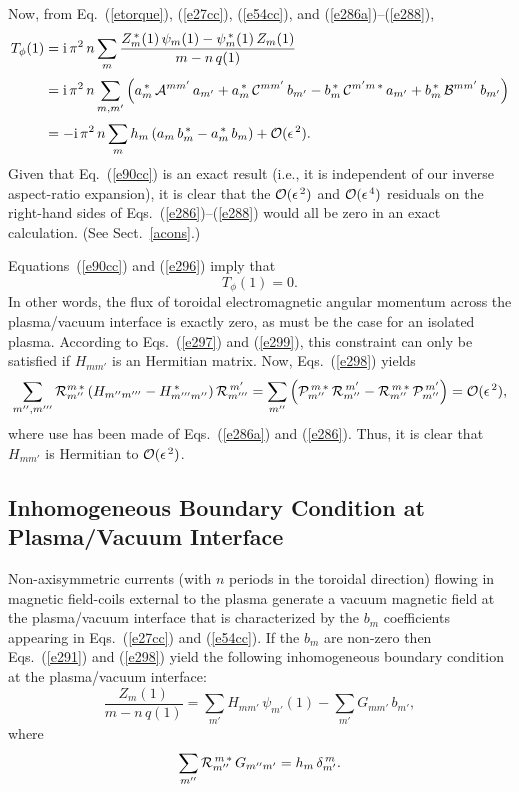 \documentclass[12pt,prb,aps]{revtex4-1}
\begin{document}
Now, from Eq.~(\ref{etorque}), (\ref{e27cc}), (\ref{e54cc}), and (\ref{e286a})--(\ref{e288}), 
\begin{align}\label{e299}
T_\phi(1) &= {\rm i}\,\pi^2\,n\sum_{m}\frac{Z_m^{\,\ast}(1)\,\psi_m(1)-\psi_m^{\,\ast}(1)\,Z_m(1)}{m-n\,q(1)}\nonumber\\[0.5ex]
&={\rm i}\,\pi^2\,n\sum_{m,m'}\left(a_m^{\,\ast}\,{\cal A}^{mm'}\,a_{m'} + a_m^{\,\ast}\,{\cal C}^{mm'}\,b_{m'}-b_m^{\,\ast}\,{\cal C}^{m'm\,\ast}\,a_{m'}
+b_m^{\,\ast}\,{\cal B}^{mm'}\,b_{m'}\right)\nonumber\\[0.5ex]
&= -{\rm i}\,\pi^2\,n\sum_m h_m\,(a_m\,b_m^{\,\ast}-a_m^{\,\ast}\,b_m) + {\cal O}(\epsilon^{\,2}).
\end{align}
Given that Eq.~(\ref{e90cc}) is an exact result (i.e., it is independent of our inverse aspect-ratio expansion), it is clear that the 
${\cal O}(\epsilon^{\,2})$ and ${\cal O}(\epsilon^{\,4})$ residuals on the right-hand sides of Eqs.~(\ref{e286})--(\ref{e288})
would all be zero in an exact calculation. (See Sect.~\ref{acons}.)

Equations~(\ref{e90cc}) and (\ref{e296}) imply that 
\begin{equation}\label{e300}
T_\phi(1)=0. 
\end{equation}
In other words, the flux of toroidal electromagnetic angular momentum across the plasma/vacuum interface is
exactly zero, as must be the case for an isolated plasma.  According to Eqs.~(\ref{e297}) and (\ref{e299}), this constraint can only be satisfied if  $H_{mm'}$ is an Hermitian matrix. 
Now, Eqs.~(\ref{e298}) yields 
\begin{equation}
\sum_{m'',m'''}{\cal R}_{m''}^{m\,\ast}\,(H_{m''m'''}-H_{m'''m''}^{\,\ast})\,{\cal R}_{m'''}^{\,m'}=\sum_{m''}\left({\cal P}_{m''}^{\,m\,\ast}\,{\cal R}_{m''}^{\,m'}- {\cal R}_{m''}^{\,m\,\ast}\,{\cal P}_{m''}^{\,m'}\right)={\cal O}(\epsilon^{\,2}),
\end{equation}
where use has been made of Eqs.~(\ref{e286a}) and (\ref{e286}). Thus, it is clear that $H_{mm'}$ is Hermitian to ${\cal O}(\epsilon^{\,2})$. 

\subsection{Inhomogeneous Boundary Condition at Plasma/Vacuum Interface}
Non-axisymmetric currents (with $n$ periods in the toroidal direction) flowing in magnetic field-coils external to the plasma generate a
vacuum magnetic field at the plasma/vacuum interface that is characterized by the $b_m$ coefficients  appearing in Eqs.~(\ref{e27cc}) and (\ref{e54cc}).
If the $b_m$ are non-zero then Eqs.~(\ref{e291}) and (\ref{e298}) yield the following inhomogeneous boundary condition at the plasma/vacuum interface:
\begin{equation}\label{inhom}
\frac{Z_{m}(1)}{m-n\,q(1)}= \sum_{m'}H_{mm'}\,\psi_{m'}(1)- \sum_{m'}G_{mm'}\,b_{m'},
\end{equation}
where
\begin{equation}\label{e337}
\sum_{m''} {\cal R}_{m''}^{\,m\,\ast}\,G_{m''m'} = h_{m}\,\delta^{\,m}_{m'}.
\end{equation}
\end{document}

